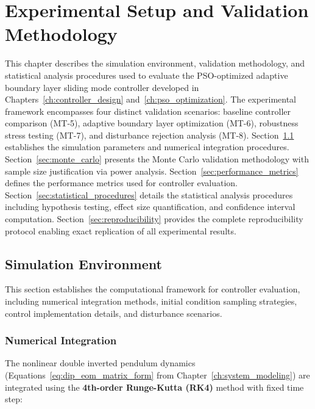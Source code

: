 \chapter{Experimental Setup and Validation Methodology}
\label{ch:experimental_setup}

This chapter describes the simulation environment, validation methodology, and statistical analysis procedures used to evaluate the PSO-optimized adaptive boundary layer sliding mode controller developed in Chapters~\ref{ch:controller_design} and~\ref{ch:pso_optimization}. The experimental framework encompasses four distinct validation scenarios: baseline controller comparison (MT-5), adaptive boundary layer optimization (MT-6), robustness stress testing (MT-7), and disturbance rejection analysis (MT-8). Section~\ref{sec:simulation_environment} establishes the simulation parameters and numerical integration procedures. Section~\ref{sec:monte_carlo} presents the Monte Carlo validation methodology with sample size justification via power analysis. Section~\ref{sec:performance_metrics} defines the performance metrics used for controller evaluation. Section~\ref{sec:statistical_procedures} details the statistical analysis procedures including hypothesis testing, effect size quantification, and confidence interval computation. Section~\ref{sec:reproducibility} provides the complete reproducibility protocol enabling exact replication of all experimental results.

\section{Simulation Environment}
\label{sec:simulation_environment}

This section establishes the computational framework for controller evaluation, including numerical integration methods, initial condition sampling strategies, control implementation details, and disturbance scenarios.

\subsection{Numerical Integration}
\label{subsec:numerical_integration}

The nonlinear double inverted pendulum dynamics (Equations~\ref{eq:dip_eom_matrix_form} from Chapter~\ref{ch:system_modeling}) are integrated using the \textbf{4th-order Runge-Kutta (RK4)} method with fixed time step:

